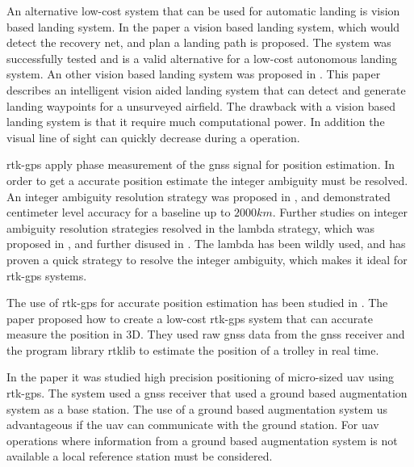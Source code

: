 An alternative low-cost system that can be used for automatic landing is vision based landing system. In the paper \citep{kim2013fully} a vision based landing system, which would detect the recovery net, and plan a landing path is proposed. The system was successfully tested and is a valid alternative for a low-cost autonomous landing system. An other vision based landing system was proposed in \citep{williams2012intelligent}. This paper describes an intelligent vision aided landing system that can detect and generate landing waypoints for a unsurveyed airfield. The drawback with a vision based landing system is that it require much computational power. In addition the visual line of sight can quickly decrease during a operation.

\acrfull{rtk-gps} apply phase measurement of the \gls{gnss} signal for position estimation. In order to get a accurate position estimate the integer ambiguity must be resolved. An integer ambiguity resolution strategy was proposed in \citep{GeodeticBaselines}, and demonstrated centimeter level accuracy for a baseline up to $2000km$. Further studies on integer ambiguity resolution strategies resolved in the \acrfull{lambda} strategy, which was proposed in \citep{Ambiguity:Estimation}, and further disused in \citep{LAMBDA:METHOD,LAMBDAMETHOD}. The \gls{lambda} has been wildly used, and has proven a quick strategy to resolve the integer ambiguity, which makes it ideal for \gls{rtk-gps} systems. 

The use of \gls{rtk-gps} for accurate position estimation has been studied in \citep{3D-RTK}. The paper proposed how to create a low-cost \gls{rtk-gps} system that can accurate measure the position in 3D. They used raw \gls{gnss} data from the \gls{gnss} receiver and the program library \acrfull{rtklib} to estimate the position of a trolley in real time.

In the paper \citep{Low-costRTK} it was studied high precision positioning of micro-sized \gls{uav} using \gls{rtk-gps}. The system used a \gls{gnss} receiver that used a ground based augmentation system as a base station. The use of a ground based augmentation system us advantageous if the \gls{uav} can communicate with the ground station. For \gls{uav} operations where information from a ground based augmentation system is not available a local reference station must be considered.



